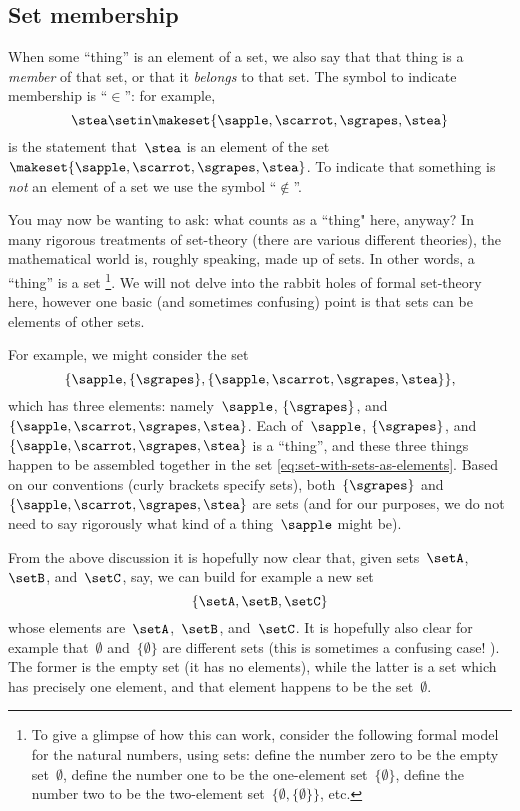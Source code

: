 \subsection{Set membership}

When some ``thing'' is an element of a set, we also say that that thing is a \emph{member} of that set, or that it \emph{belongs} to that set.
The symbol to indicate membership is ``$\in$'': for example,
\begin{equation*}
    \stea \setin\makeset{ \sapple, \scarrot, \sgrapes, \stea }
\end{equation*}
is the statement that~$\stea$ is an element of the set~$\makeset{ \sapple, \scarrot, \sgrapes, \stea }$.
To indicate that something is \emph{not} an element of a set we use the symbol ``$\notin$''.

You may now be wanting to ask: what counts as a ``thing" here, anyway?
In many rigorous treatments of set-theory (there are various different theories), the mathematical world is, roughly speaking, made up of sets.
In other words, a ``thing'' is a set
\footnote{To give a glimpse of how this can work, consider the following formal model for the natural numbers, using sets: define the number zero to be the empty set~$\emptyset$, define the number one to be the one-element set~$\{ \emptyset \}$, define the number two to be the two-element set~$\{ \emptyset, \{ \emptyset \} \}$, etc. }.
We will not delve into the rabbit holes of formal set-theory here, however one basic (and sometimes confusing) point is that sets can be elements of other sets.

For example, we might consider the set
%
\begin{equation}\label{eq:set-with-sets-as-elements}
    \{ \sapple, \{ \sgrapes \}, \{ \sapple, \scarrot, \sgrapes, \stea \} \},
\end{equation}
%
which has three elements: namely~$\sapple$, $\{ \sgrapes \}$, and~$\{ \sapple, \scarrot, \sgrapes, \stea \}$.
Each of~$\sapple$, $\{ \sgrapes \}$, and~$\{ \sapple, \scarrot, \sgrapes, \stea \}$ is a ``thing'', and these three things happen to be assembled together in the set \cref{eq:set-with-sets-as-elements}.
Based on our conventions (curly brackets specify sets), both~$\{ \sgrapes \}$ and~$\{ \sapple, \scarrot, \sgrapes, \stea \}$ are sets (and for our purposes, we do not need to say rigorously what kind of a thing~$\sapple$ might be).

From the above discussion it is hopefully now clear that, given sets~$\setA$,~$\setB$, and~$\setC$, say, we can build for example a new set
\begin{equation*}
    \{ \setA, \setB, \setC \}
\end{equation*}
whose elements are~$\setA$,~$\setB$, and~$\setC$.
It is hopefully also clear for example that~$\emptyset$ and~$\{ \emptyset \}$ are different sets (this is sometimes a confusing case!
).
The former is the empty set (it has no elements), while the latter is a set which has precisely one element, and that element happens to be the set~$\emptyset$.

